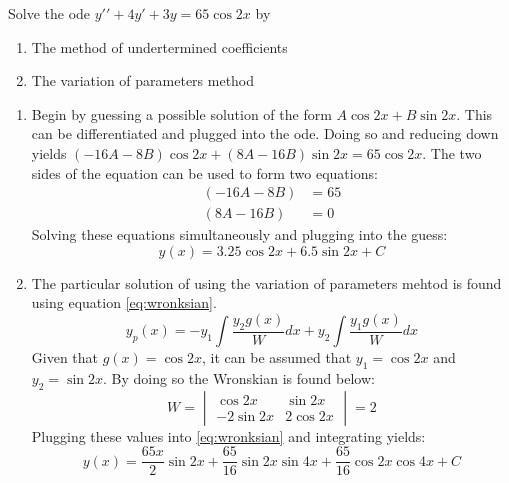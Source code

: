 Solve the ode $y\prime\prime+4y\prime+3y=65\cos 2x$ by
\begin{enumerate}
	\item The method of undertermined coefficients
	\item The variation of parameters method
\end{enumerate}

\begin{enumerate}
	\item Begin by guessing a possible solution of the form $A\cos 2x +B\sin 2x$. This can be differentiated and plugged into the ode. Doing so and reducing down yields $(-16A-8B)\cos 2x +(8A-16B)\sin 2x=65\cos 2x$. The two sides of the equation can be used to form two equations:
\begin{align*}
	(-16A-8B)&=65\\
	(8A-16B)&=0
\end{align*}
Solving these equations simultaneously and plugging into the guess:
\begin{equation*}
	\boxed{y(x)=3.25\cos 2x +6.5 \sin 2x+C}
\end{equation*}
	\item The particular solution of using the variation of parameters mehtod is found using equation \ref{eq:wronksian}.
	\begin{equation}
		y_p(x)=-y_1\int\frac{y_2g(x)}{W}dx+y_2\int \frac{y_1g(x)}{W}dx
		\label{eq:wronksian}
	\end{equation}
	Given that $g(x)=\cos 2x$, it can be assumed that $y_1=\cos 2x$ and $y_2=\sin 2x$. By doing so the Wronskian is found below:
	\begin{equation*}W=
		\begin{vmatrix} 
			\cos 2x & \sin 2x\\ -2\sin 2x & 2\cos 2x
		\end{vmatrix}=2
	\end{equation*}
Plugging these values into \ref{eq:wronksian} and integrating yields:
\begin{equation*}
	\boxed{
		y(x)=\frac{65x}{2}\sin 2x+\frac{65}{16}\sin 2x \sin 4x + \frac{65}{16}\cos 2x \cos 4x +C
		}
\end{equation*}
\end{enumerate}